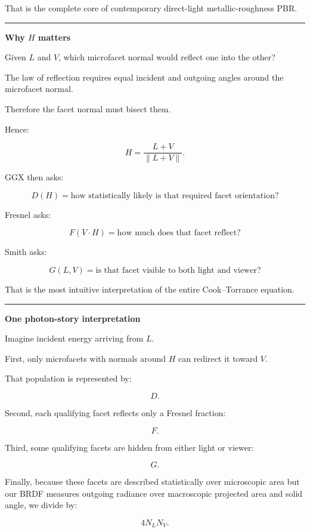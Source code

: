 That is the complete core of contemporary direct-light metallic-roughness PBR.

\begin{center}\rule{0.5\linewidth}{0.5pt}\end{center}

\textbf{Why \(H\) matters}

Given \(L\) and \(V\), which microfacet normal would reflect one into the other?

The law of reflection requires equal incident and outgoing angles around the microfacet normal.

Therefore the facet normal must bisect them.

Hence:

\[
\boxed{
H=
\frac{L+V}{\|L+V\|}.
}
\]

GGX then asks:

\[
D(H)=
\text{how statistically likely is that required facet orientation?}
\]

Fresnel asks:

\[
F(V\cdot H)=
\text{how much does that facet reflect?}
\]

Smith asks:

\[
G(L,V)=
\text{is that facet visible to both light and viewer?}
\]

That is the most intuitive interpretation of the entire Cook--Torrance equation.

\begin{center}\rule{0.5\linewidth}{0.5pt}\end{center}

\textbf{One photon-story interpretation}

Imagine incident energy arriving from \(L\).

First, only microfacets with normals around \(H\) can redirect it toward \(V\).

That population is represented by:

\[
D.
\]

Second, each qualifying facet reflects only a Fresnel fraction:

\[
F.
\]

Third, some qualifying facets are hidden from either light or viewer:

\[
G.
\]

Finally, because these facets are described statistically over microscopic area but our BRDF measures outgoing radiance over macroscopic projected area and solid angle, we divide by:

\[
4N_LN_V.
\]

